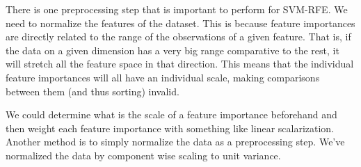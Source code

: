 There is one preprocessing step that is important to perform for SVM-RFE. We need to normalize the features of the dataset. This is because feature importances are directly related to the range of the observations of a given feature. That is, if the data on a given dimension has a very big range comparative to the rest, it will stretch all the feature space in that direction. This means that the individual feature importances will all have an individual scale, making comparisons between them (and thus sorting) invalid.

We could determine what is the scale of a feature importance beforehand and then weight each feature importance with something like linear scalarization. An\-oth\-er method is to simply normalize the data as a preprocessing step. We've nor\-mal\-ized the data by component wise scaling to unit variance. 



